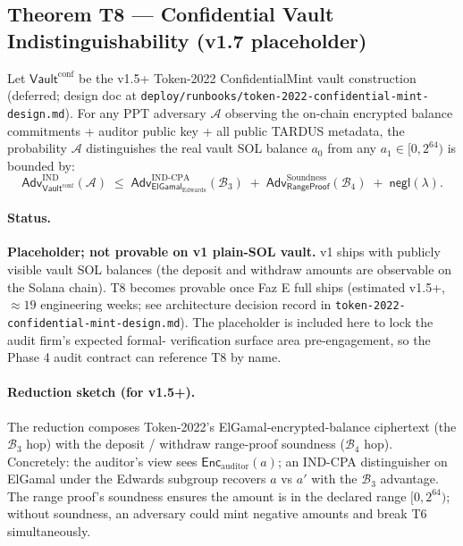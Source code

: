 \subsection{Theorem T8 --- Confidential Vault Indistinguishability (v1.7 placeholder)}
\label{sec:theorem-T8}

\begin{theorem}
\label{thm:T8}
Let $\mathsf{Vault}^{\mathrm{conf}}$ be the v1.5+
Token-2022 ConfidentialMint vault construction (deferred; design
doc at \texttt{deploy/runbooks/token-2022-confidential-mint-design.md}).
For any PPT adversary $\mathcal{A}$ observing the on-chain
encrypted balance commitments + auditor public key + all public
TARDUS metadata, the probability $\mathcal{A}$ distinguishes the
real vault SOL balance $a_0$ from any
$a_1 \in [0, 2^{64})$ is bounded by:
\[
  \mathsf{Adv}^{\mathrm{IND}}_{\mathsf{Vault}^{\mathrm{conf}}}(\mathcal{A}) \;\leq\;
  \mathsf{Adv}^{\mathrm{IND\text{-}CPA}}_{\mathsf{ElGamal}_{\mathrm{Edwards}}}(\mathcal{B}_3) \;+\;
  \mathsf{Adv}^{\mathrm{Soundness}}_{\mathsf{RangeProof}}(\mathcal{B}_4) \;+\;
  \mathsf{negl}(\lambda).
\]
\end{theorem}

\paragraph{Status.} \textbf{Placeholder; not provable on v1
plain-SOL vault.} v1 ships with publicly visible vault SOL
balances (the deposit and withdraw amounts are observable on
the Solana chain). T8 becomes provable once Faz E full ships
(estimated v1.5+, $\approx 19$ engineering weeks; see
architecture decision record in
\texttt{token-2022-confidential-mint-design.md}). The placeholder
is included here to lock the audit firm's expected formal-
verification surface area pre-engagement, so the Phase 4 audit
contract can reference T8 by name.

\paragraph{Reduction sketch (for v1.5+).}
The reduction composes Token-2022's
ElGamal-encrypted-balance ciphertext (the $\mathcal{B}_3$ hop)
with the deposit / withdraw range-proof soundness
($\mathcal{B}_4$ hop). Concretely: the auditor's view sees
$\mathsf{Enc}_{\mathrm{auditor}}(a)$; an IND-CPA distinguisher on
ElGamal under the Edwards subgroup recovers $a$ vs $a'$ with the
$\mathcal{B}_3$ advantage. The range proof's soundness ensures
the amount is in the declared range $[0, 2^{64})$; without
soundness, an adversary could mint negative amounts and break
T6 simultaneously.

